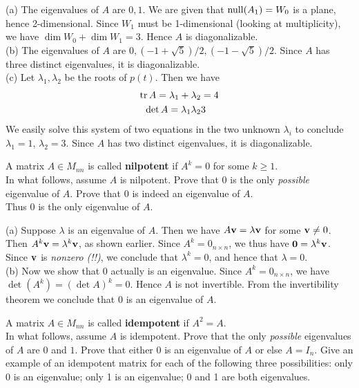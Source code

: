 \begin{solution}
\noindent (a) The eigenvalues of $A$ are $0, 1$. We are given that $\operatorname{null}(A_1)=W_0$ is a plane, hence 2-dimensional. Since $W_1$ must be 1-dimensional (looking at multiplicity), we have $\dim W_0+\dim W_1=3$. Hence $A$ is diagonalizable. 
\\
(b) The eigenvalues of $A$ are $0, (-1+\sqrt{5})/2, (-1-\sqrt{5})/2$. Since $A$ has three distinct eigenvalues, it is diagonalizable. 
\\
(c) Let $\lambda_1, \lambda_2$ be the roots of $p(t)$. Then we have 
\begin{align*}
\operatorname{tr} A=\lambda_1+\lambda_2&=4\\
\det A=\lambda_1\lambda_2&3
\end{align*}
We easily solve this system of two equations in the two unknown $\lambda_i$ to conclude $\lambda_1=1$, $\lambda_2=3$. Since $A$ has two distinct eigenvalues, it is diagonalizable. 
\end{solution}
\ii A matrix $A\in M_{nn}$ is called {\bf nilpotent} if $A^k=0$ for some $k\geq 1$. 
\\
In what follows, assume $A$ is nilpotent. 
\bb[itemsep=5pt]
\ii Prove that $0$ is the only {\em possible} eigenvalue of $A$. 
\ii Prove that $0$ is indeed an eigenvalue of $A$. 
\\
Thus $0$ is the only eigenvalue of $A$. 
\ee
\begin{solution}
\noindent (a) Suppose $\lambda$ is an eigenvalue of $A$. Then we have $A{\mathbf v}=\lambda {\mathbf v}$ for some ${\mathbf v}\ne 0$. Then $A^k{\mathbf v}=\lambda^k{\mathbf v}$, as shown earlier. Since $A^k=0_{n\times n}$, we thus have ${\mathbf 0}=\lambda^k{\mathbf v}$. Since ${\mathbf v}$ is {\em nonzero (!!)}, we conclude that $\lambda^k=0$, and hence that $\lambda=0$. 
\\
\noindent 
(b) Now we show that $0$ actually is an eigenvalue. Since $A^k=0_{n\times n}$, we have $\det(A^k)=(\det A)^k=0$. Hence $A$ is not invertible. From the invertibility theorem we conclude that $0$ is an eigenvalue of $A$. 
\end{solution}
\ii A matrix $A\in M_{nn}$ is called {\bf idempotent} if $A^2=A$.
\\
In what follows, assume $A$ is idempotent. 
\bb
\ii Prove that the only {\em possible} eigenvalues of $A$ are $0$ and $1$. 
\ii Prove that either $0$ is an eigenvalue of $A$ or else $A=I_n$. 
\ii Give an example of an idempotent matrix for each of the following three possibilities: only 0 is an eigenvalue; only 1 is an eigenvalue; 0 and 1 are both eigenvalues. 
